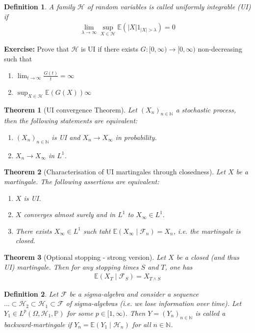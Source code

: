 \documentclass[11pt,a4paper, final]{article}
\newtheorem{thm}{Theorem}[section]
\newtheorem{defn}{Definition}[section]
\theoremstyle{definition}
\begin{document}
\begin{defn} A family $\mathcal{H}$ of random variables is called uniformly integrable (UI) if 
\begin{align*}
\lim_{\lambda \to \infty} \sup_{X \in \mathcal{H}} \mathbb{E}( |X| 1_{|X| > \lambda} ) = 0 
\end{align*}
\end{defn}
\noindent \textbf{Exercise:} Prove that $\mathcal{H}$ is UI if there exists $G: [0, \infty) \to [0, \infty)$ non-decreasing such that 
\begin{enumerate}
\item $\lim_{t \to \infty} \frac{G(t)}{t} = \infty$ 
\item $\sup_{X \in \mathcal{H}} \mathbb{E}(G(X)) \infty$ 
\end{enumerate}
\begin{thm}[UI convergence Theorem] Let $(X_n)_{n \in \mathbb{N}}$ a stochastic process, then the following statements are equivalent:
\begin{enumerate}
\item $(X_n)_{n \in \mathbb{N}}$ is UI and $X_n \to X_\infty$ in probability.
\item $X_n \to X_\infty$ in $L^1$.
\end{enumerate}
\end{thm}
\begin{thm}[Characterisation of UI martingales through closedness] Let $X$ be a martingale. The following assertions are equivalent:
\begin{enumerate}
\item $X$ is UI. 
\item $X$ converges almost surely and in $L^1$ to $X_\infty \in L^1.$ 
\item There exists $X_\infty \in L^1$ such taht $\mathbb{E}(X_\infty \mid \mathcal{F}_n) = X_n$, i.e. the martingale is closed. 
\end{enumerate}
\end{thm}
\begin{thm}[Optional stopping - strong version] Let $X$ be a closed (and thus UI) martingale. Then for any stopping times $S$ and $T$, one has 
\begin{align*}
\mathbb{E}(X_T \mid \mathcal{F}_S)= X_{T \wedge S}
\end{align*}
\end{thm}
\newpage
\begin{defn} Let $\mathcal{F}$ be a sigma-algebra and consider a sequence \\ $\dots \subset \mathcal{H}_2 \subset \mathcal{H}_1 \subset \mathcal{F}$ of sigma-algebras (i.e. we lose information over time). Let $Y_1 \in L^p( \Omega, \mathcal{H}_1, \mathbb{P})$ for some $p \in [1, \infty)$. Then $Y=(Y_n)_{n \in \mathbb{N}}$ is called a backward-martingale if $Y_n= \mathbb{E}(Y_1 \mid \mathcal{H}_n)$ for all $n \in \mathbb{N}$. 
\end{defn}
\end{document}
